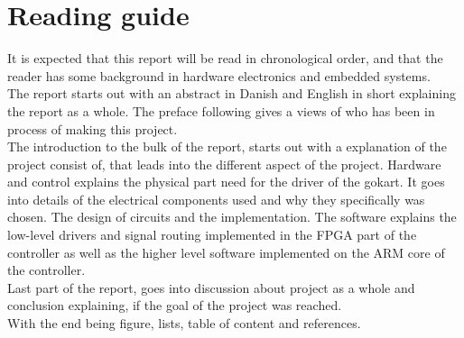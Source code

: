\section{Reading guide}
It is expected that this report will be read in chronological order, and that the reader has some background in hardware electronics and embedded systems.\\

The report starts out with an abstract in Danish and English in short explaining the report as a whole. The preface following gives a views of who has been in process of making this project. \\

The introduction to the bulk of the report, starts out with a explanation of the project consist of, that leads into the different aspect of the project. Hardware and control explains the physical part need for the driver of the gokart. It goes into details of the electrical components used and why they specifically was chosen. The design of circuits and the implementation. The software explains the low-level drivers and signal routing implemented in the FPGA part of the controller as well as the higher level software implemented on the ARM core of the controller. \\

Last part of the report, goes into discussion about project as a whole and conclusion explaining, if the goal of the project was reached. \\

With the end being figure, lists, table of content and references.\\
